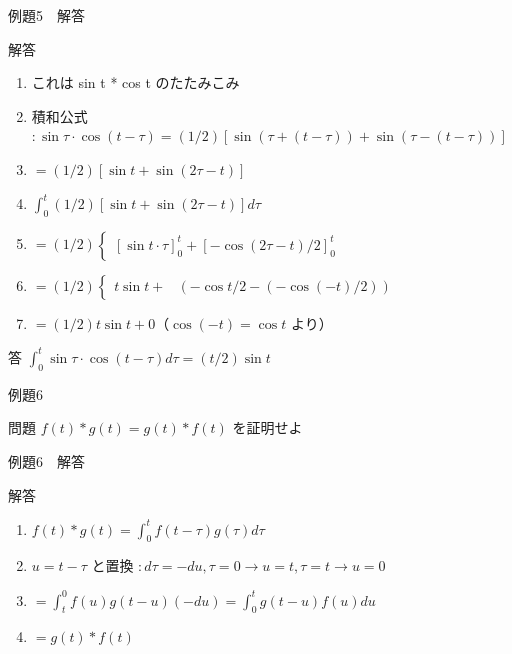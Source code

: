 \documentclass[aspectratio=43,professionalfonts,handout]{beamer}
\begin{document}
\begin{frame}{例題5　解答}
  \begin{exampleblock}{解答}
  \begin{enumerate}[1.]
    \item[] これは sin t * cos t のたたみこみ
    \item[] 積和公式 $: \sin \tau\cdot \cos(t-\tau) = (1/2)[\sin(\tau+(t-\tau)) + \sin(\tau-(t-\tau))]$
    \item[] $= (1/2)[\sin t + \sin(2\tau-t)]$
    \item[] $\int_{0}^t (1/2)[\sin t + \sin(2\tau-t)]d\tau$
    \item[] $= (1/2)\begin{cases} [\sin t \cdot \tau]_{0}^t + [-\cos(2\tau-t)/2]_{0}^t \end{cases}$
    \item[] $= (1/2)\begin{cases} t \sin t + & (-\cos t/2 - (-\cos(-t)/2)) \end{cases}$
    \item[] $= (1/2){t \sin t + 0}$（$\cos(-t) = \cos t$ より）
  \end{enumerate}
  \end{exampleblock}
  \begin{alertblock}{答}
    $\int_{0}^t \sin \tau \cdot \cos(t-\tau) d\tau = (t/2) \sin t$
  \end{alertblock}
\end{frame}

\begin{frame}{例題6}
  \begin{exampleblock}{問題}
    $f(t) * g(t) = g(t) * f(t)$ を証明せよ\\[2pt]
  \end{exampleblock}
\end{frame}

\begin{frame}{例題6　解答}
  \begin{exampleblock}{解答}
  \begin{enumerate}[1.]
    \item[] $f(t)*g(t) = \int_{0}^t f(t-\tau)g(\tau)d\tau$
    \item[] $u = t-\tau$ と置換 $: d\tau = -du, \tau=0 \to u=t, \tau=t \to u=0$
    \item[] $= \int_{t}^0 f(u)g(t-u)(-du) = \int_{0}^t g(t-u)f(u)du$
    \item[] $= g(t)*f(t)$
  \end{enumerate}
  \end{exampleblock}
\end{frame}
\end{document}
